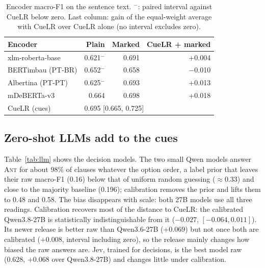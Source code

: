 \documentclass[11pt]{article}
\begin{document}
\begin{table}[t]
\centering\small
\begin{tabular}{lrrr}
\toprule
Encoder & Plain & Marked & CueLR + marked \\
\midrule
xlm-roberta-base & 0.621$^{-}$ & 0.691 & +0.004 \\
BERTimbau (PT-BR) & 0.652$^{-}$ & 0.658 & $-$0.010 \\
Albertina (PT-PT) & 0.625$^{-}$ & 0.693 & +0.013 \\
mDeBERTa-v3 & 0.664 & 0.698 & +0.018 \\
\midrule
CueLR (cues) & \multicolumn{3}{l}{0.695 [0.665, 0.725]} \\
\bottomrule
\end{tabular}
\caption{Encoder macro-F1 on the sentence text. $^{-}$: paired interval against CueLR below zero. Last column: gain of the equal-weight average with CueLR over CueLR alone (no interval excludes zero).}
\label{tab:encoders}
\end{table}

\subsection{Zero-shot LLMs add to the cues}
\label{sec:llm}
Table~\ref{tab:llm} shows the decision models. The two small Qwen models answer \textsc{Ant} for about 98\% of clauses whatever the option order, a label prior that leaves their raw macro-F1 (0.16) below that of uniform random guessing ($\approx 0.33$) and close to the majority baseline (0.196); calibration removes the prior and lifts them to 0.48 and 0.58. The bias disappears with scale: both 27B models use all three readings. Calibration recovers most of the distance to CueLR: the calibrated Qwen3.8-27B is statistically indistinguishable from it ($-0.027$, $[-0.064, 0.011]$). Its newer release is better raw than Qwen3.6-27B ($+0.069$) but not once both are calibrated ($+0.008$, interval including zero), so the release mainly changes how biased the raw answers are. Jev, trained for decisions, is the best model raw (0.628, $+0.068$ over Qwen3.8-27B) and changes little under calibration.
\end{document}
